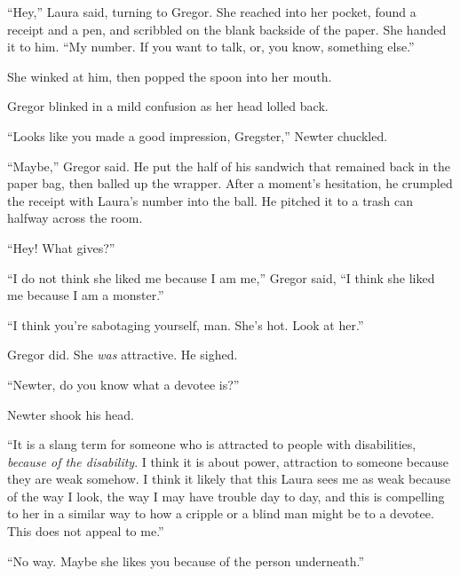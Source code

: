``Hey,'' Laura said, turning to Gregor.  She reached into her pocket, found a receipt and a pen, and scribbled on the blank backside of the paper.  She handed it to him.  ``My number.  If you want to talk, or, you know, something else.''



She winked at him, then popped the spoon into her mouth.



Gregor blinked in a mild confusion as her head lolled back.



``Looks like you made a good impression, Gregster,'' Newter chuckled.



``Maybe,'' Gregor said.  He put the half of his sandwich that remained back in the paper bag, then balled up the wrapper.  After a moment's hesitation, he crumpled the receipt with Laura's number into the ball.  He pitched it to a trash can halfway across the room.



``Hey!  What gives?''



``I do not think she liked me because I am me,'' Gregor said, ``I think she liked me because I am a monster.''



``I think you're sabotaging yourself, man.  She's hot.  Look at her.''



Gregor did.  She \emph{was} attractive.  He sighed.



``Newter, do you know what a devotee is?''



Newter shook his head.



``It is a slang term for someone who is attracted to people with disabilities, \emph{because of the disability}.  I think it is about power, attraction to someone because they are weak somehow.  I think it likely that this Laura sees me as weak because of the way I look, the way I may have trouble day to day, and this is compelling to her in a similar way to how a cripple or a blind man might be to a devotee.  This does not appeal to me.''



``No way.  Maybe she likes you because of the person underneath.''



